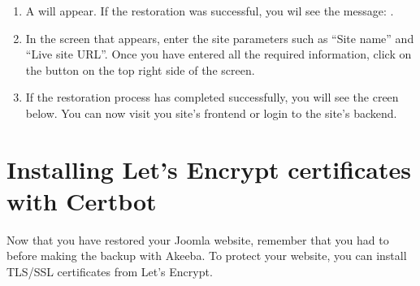 \documentclass[letterpaper,10pt,english]{sphinxmanual}
\begin{document}
\begin{enumerate}
\begin{figure}[htbp]
\noindent{}
\end{figure}

\item {} 
\sphinxAtStartPar
A  will appear. If the restoration was successful, you wil see the message: .
\begin{quote}

\begin{figure}[htbp]
\centering

\noindent{}
\end{figure}

\newpage
\end{quote}

\item {} 
\sphinxAtStartPar
In the screen that appears, enter the site parameters such as “Site name” and “Live site URL”. Once you have entered all the required information, click on the button  on the top right side of the screen.
\begin{quote}

\begin{figure}[htbp]
\centering

\noindent{}
\end{figure}
\end{quote}

\item {} 
\sphinxAtStartPar
If the restoration process has completed successfully, you will see the creen below. You can now visit you site’s frontend or login to the site’s backend.
\begin{quote}

\begin{figure}[htbp]
\centering

\noindent{}
\end{figure}
\end{quote}

\end{enumerate}


\section{Installing Let’s Encrypt certificates with Certbot}
\label{\detokenize{joomla-to-vps:installing-let-s-encrypt-certificates-with-certbot}}
\sphinxAtStartPar
Now that you have restored your Joomla website, remember that you had to {\hyperref[\detokenize{joomla-to-vps:disable-ssl}]{}} before making the backup with Akeeba.
To protect your website, you can install TLS/SSL certificates from Let’s Encrypt.
\end{document}
